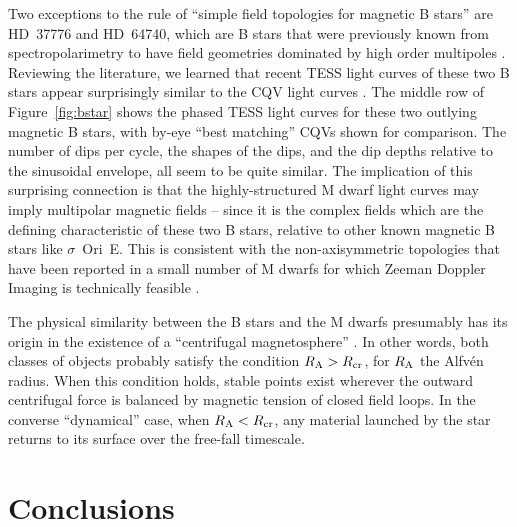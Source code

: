 \documentclass[11pt,twocolumn,tighten]{aastex63}
\begin{document}
Two exceptions to the rule of ``simple field topologies for magnetic
B stars'' are HD~37776 and HD~64740, which are B stars that were
previously known from spectropolarimetry to have
field geometries dominated by high order multipoles
\citep{2011ApJ...726...24K}.  Reviewing the literature, we
learned that recent TESS light curves of these two B stars appear
surprisingly similar to the CQV light curves
\citep{2020pase.conf...46M}.  The middle row of Figure~\ref{fig:bstar}
shows the phased TESS light curves for these two outlying magnetic B
stars, with by-eye ``best matching'' CQVs shown for comparison.  The
number of dips per cycle, the shapes of the dips, and the dip depths
relative to the sinusoidal envelope, all seem to be quite similar.
The implication of this surprising connection is that the
highly-structured M dwarf light curves may imply multipolar magnetic
fields -- since it is the complex fields which are the defining
characteristic of these two B stars, relative to other known magnetic
B stars like $\sigma$~Ori~E.  This is consistent with the
non-axisymmetric topologies that have been reported in a small number
of M dwarfs for which Zeeman Doppler Imaging is technically feasible
\citep[see the review by][]{2021A&ARv..29....1K}.

The physical similarity between the B stars and the M dwarfs
presumably has its origin in the existence of a ``centrifugal
magnetosphere'' \citep[see][]{2013MNRAS.429..398P}.  In other words,
both classes of objects probably satisfy the condition $R_{\rm A} >
R_{\rm cr}$, for $R_{\rm A}$ the Alfv\'en radius.  When this condition
holds, stable points exist wherever the outward centrifugal force is
balanced by magnetic tension of closed field loops.  In the converse
``dynamical'' case, when  $R_{\rm A} < R_{\rm cr}$, any material
launched by the star returns to its surface over the free-fall
timescale.



\section{Conclusions}
\label{sec:conclusion}
\end{document}
